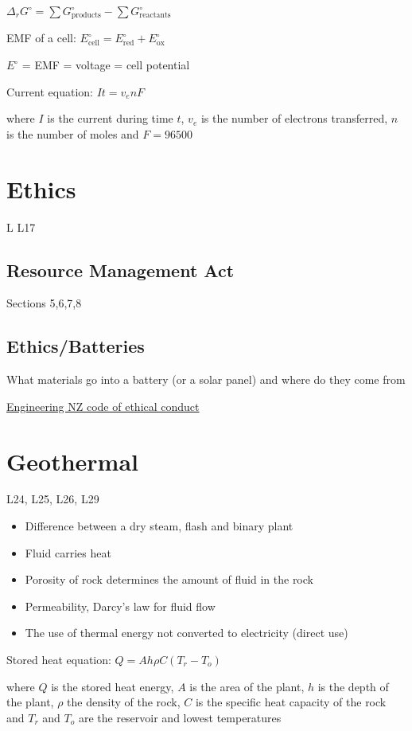 \documentclass[a4paper, 12pt]{article}
\begin{document}
$\Delta_r G^\circ = \sum G^\circ_\text{products} - \sum G^\circ_\text{reactants}$

EMF of a cell: $E^\circ_\text{cell} = E^\circ_\text{red} + E^\circ_\text{ox}$

{\scriptsize $E^\circ$ = EMF = voltage = cell potential \/}

Current equation: $It = v_enF$

{\scriptsize where $I$ is the current during time $t$, $v_e$ is the number of electrons transferred, $n$ is the number of moles and $F=96500$ \/}

\newpage
\section*{Ethics}
L L17
\subsection*{Resource Management Act}
Sections 5,6,7,8
\subsection*{Ethics/Batteries}
What materials go into a battery (or a solar panel) and where do they come from

\href{https://www.engineeringnz.org/resources/code-ethical-conduct/}{Engineering NZ code of ethical conduct}

\newpage
\section*{Geothermal}
L24, L25, L26, L29
\begin{itemize}
  \item Difference between a dry steam, flash and binary plant 
  \item Fluid carries heat
  \item Porosity of rock determines the amount of fluid in the rock
  \item Permeability, Darcy's law for fluid flow 
  \item The use of thermal energy not converted to electricity (direct use)
\end{itemize}
Stored heat equation:  
$  Q = Ah\rho C(T_r-T_o) $

{\scriptsize where $Q$ is the stored heat energy, $A$ is the area of the plant, $h$ is the depth of the plant, $\rho$ the density of the rock, $C$ is the specific heat capacity of the rock and $T_r$ and $T_o$ are the reservoir and lowest temperatures\/}
\end{document}
